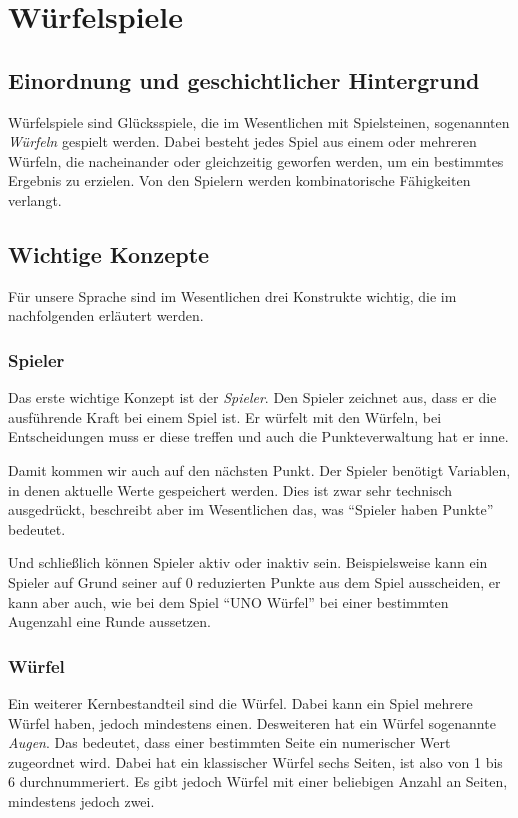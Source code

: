 
\chapter{Würfelspiele}
\label{cha:wurfelspiele}
	\section{Einordnung und geschichtlicher Hintergrund}
	\label{sec:einordnung_und_geschichtlicher_hintergrund}
        Würfelspiele sind Glücksspiele, die im Wesentlichen mit Spielsteinen, sogenannten \emph{Würfeln} gespielt werden. Dabei besteht jedes Spiel aus einem oder mehreren Würfeln, die nacheinander oder gleichzeitig geworfen werden, um ein bestimmtes Ergebnis zu erzielen. Von den Spielern werden kombinatorische Fähigkeiten verlangt.

        \section{Wichtige Konzepte}
        \label{sec:wichtige_konzepte}
        	Für unsere Sprache sind im Wesentlichen drei Konstrukte wichtig, die im nachfolgenden erläutert werden.
            \subsection{Spieler}
            \label{sub:spieler}
                Das erste wichtige Konzept ist der \emph{Spieler}. Den Spieler zeichnet aus, dass er die ausführende Kraft bei einem Spiel ist. Er würfelt mit den Würfeln, bei Entscheidungen muss er diese treffen und auch die Punkteverwaltung hat er inne.

                Damit kommen wir auch auf den nächsten Punkt. Der Spieler benötigt Variablen, in denen aktuelle Werte gespeichert werden. Dies ist zwar sehr technisch ausgedrückt, beschreibt aber im Wesentlichen das, was ``Spieler haben Punkte'' bedeutet.

                Und schließlich können Spieler aktiv oder inaktiv sein. Beispielsweise kann ein Spieler auf Grund seiner auf 0 reduzierten Punkte aus dem Spiel ausscheiden, er kann aber auch, wie bei dem Spiel ``UNO Würfel'' bei einer bestimmten Augenzahl eine Runde aussetzen.
            \subsection{Würfel}
            \label{sub:wurfel}
                Ein weiterer Kernbestandteil sind die Würfel. Dabei kann ein Spiel mehrere Würfel haben, jedoch mindestens einen. Desweiteren hat ein Würfel sogenannte \emph{Augen}. Das bedeutet, dass einer bestimmten Seite ein numerischer Wert zugeordnet wird. Dabei hat ein klassischer Würfel sechs Seiten, ist also von 1 bis 6 durchnummeriert. Es gibt jedoch Würfel mit einer beliebigen Anzahl an Seiten, mindestens jedoch zwei.

